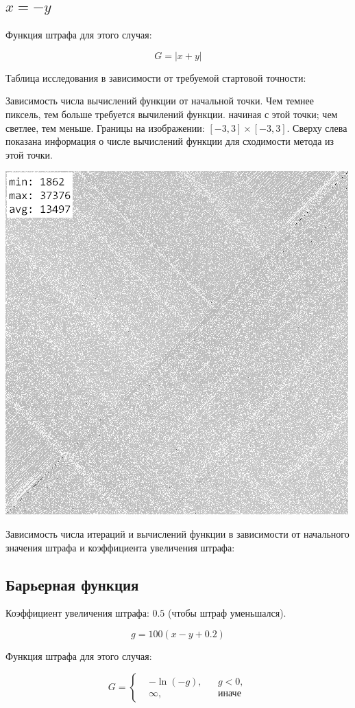 \subsection{$x=-y$}

Функция штрафа для этого случая:

$$G = |x+y|$$

Таблица исследования в зависимости от требуемой стартовой точности:


Зависимость числа вычислений функции от начальной точки. Чем темнее пиксель, тем больше требуется вычилений функции. начиная с этой точки; чем светлее, тем меньше. Границы на изображении: $[-3, 3]\times[-3, 3]$. Сверху слева показана информация о числе вычислений функции для сходимости метода из этой точки.

\noindent\begin{center}\includegraphics[width=.5\textwidth]{2.png}\end{center}

Зависимость числа итераций и вычислений функции в зависимости от начального значения штрафа и коэффициента увеличения штрафа:


\subsection{Барьерная функция}

Коэффициент увеличения штрафа: $0.5$ (чтобы штраф уменьшался).

$$ g = 100(x-y+0.2) $$

Функция штрафа для этого случая:

$$ G = \left\{\begin{aligned}
&-\ln(-g), && g < 0, \\
&\infty, && \text{иначе}
\end{aligned}\right. $$

